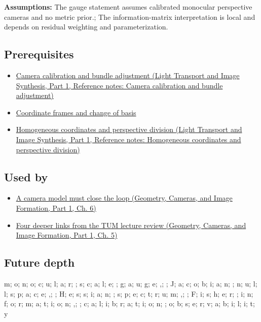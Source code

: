 \textbf{Assumptions:} The gauge statement assumes calibrated monocular perspective cameras and no metric prior.; The information-matrix interpretation is local and depends on residual weighting and parameterization.

\subsection{Prerequisites}\label{appendix-113f0267e5f4-prerequisites}

\hypertarget{appendix-113f0267e5f4-prerequisites}{}

\begin{itemize}
\tightlist
\item
  \href{../04-Light-Transport-and-Image-Synthesis-P01/main.pdf\#nameddest=appendix-3ee9861904d5}{Camera calibration and bundle adjustment (Light Transport and Image Synthesis, Part 1, Reference notes: Camera calibration and bundle adjustment)}
\item
  \hyperref[appendix-1bae9457dbc3]{Coordinate frames and change of basis}
\item
  \href{../04-Light-Transport-and-Image-Synthesis-P01/main.pdf\#nameddest=appendix-cb3b26862282}{Homogeneous coordinates and perspective division (Light Transport and Image Synthesis, Part 1, Reference notes: Homogeneous coordinates and perspective division)}
\end{itemize}

\subsection{Used by}\label{appendix-113f0267e5f4-used-by}

\hypertarget{appendix-113f0267e5f4-used-by}{}

\begin{itemize}
\tightlist
\item
  \href{../03-Geometry-Cameras-and-Image-Formation-P01/main.pdf\#nameddest=02-foundations-ii-ch037-a-camera-model-must-close-the-loop}{A camera model must close the loop (Geometry, Cameras, and Image Formation, Part 1, Ch. 6)}
\item
  \href{../03-Geometry-Cameras-and-Image-Formation-P01/main.pdf\#nameddest=02-foundations-ii-ch036-four-deeper-links-from-the-tum-lecture-review}{Four deeper links from the TUM lecture review (Geometry, Cameras, and Image Formation, Part 1, Ch. 5)}
\end{itemize}

\subsection{Future depth}\label{appendix-113f0267e5f4-future-depth}

\hypertarget{appendix-113f0267e5f4-future-depth}{}

m; o; n; o; c; u; l; a; r; ; s; c; a; l; e; ; g; a; u; g; e; ,; ; J; a; c; o; b; i; a; n; ; n; u; l; l; s; p; a; c; e; ,; ; H; e; s; s; i; a; n; ; s; p; e; c; t; r; u; m; ,; ; F; i; s; h; e; r; ; i; n; f; o; r; m; a; t; i; o; n; ,; ; c; a; l; i; b; r; a; t; i; o; n; ; o; b; s; e; r; v; a; b; i; l; i; t; y
